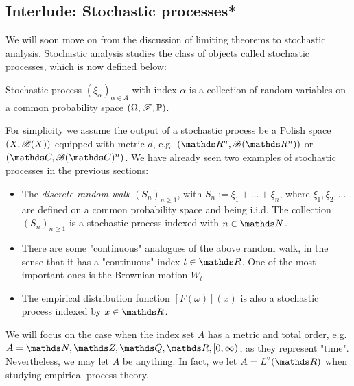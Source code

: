 \subsection{Interlude: Stochastic processes*}

\begin{unexaminable}
We will soon move on from the discussion of limiting theorems to stochastic analysis. Stochastic analysis studies the class of objects called stochastic processes, which is now defined below: 
\begin{definition}
Stochastic process $(\xi_\alpha)_{\alpha \in A}$ with index $\alpha$ is a collection of random variables on a common probability space $(\Omega,\mathcal{F},\mathbb{P})$.
\end{definition}

For simplicity we assume the output of a stochastic process be a Polish space $(X,\mathcal{B}(X))$ equipped with metric $d$, e.g. $(\R^n, \B(\R^n))$ or $(\C,\B(\C)^n)$. We have already seen two examples of stochastic processes in the previous sections:
\begin{itemize}
\item The \textit{discrete random walk} $(S_n)_{n\geq 1}$, with $S_n := \xi_1 + ... + \xi_n$, where $\xi_1, \xi_2,...$ are defined on a common probability space and being i.i.d. The collection $(S_n)_{n\geq 1}$ is a stochastic process indexed with $n \in \N$.
\item There are some "continuous" analogues of the above random walk, in the sense that it has a "continuous" index $t \in \R$. One of the most important ones is the Brownian motion $W_t$.
\item The empirical distribution function $[F(\omega)](x)$ is also a stochastic process indexed by $x \in \R$.
\end{itemize}

We will focus on the case when the index set $A$ has a metric and total order, e.g. $A = \N, \Z, \Q, \R, [0,\infty)$, as they represent "time". Nevertheless, we may let $A$ be anything. In fact, we let $A = L^2(\R)$ when studying empirical process theory.\\


\end{unexaminable}
